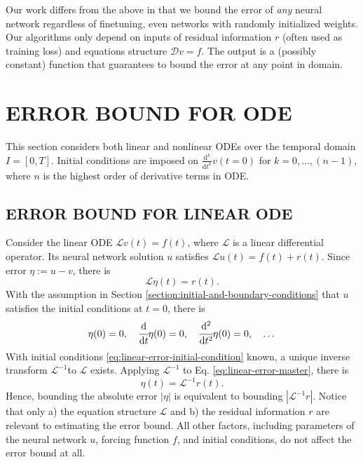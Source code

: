 \documentclass{uai2023}
\newcommand{\dt}[1]{\cfrac{\mathrm{d} #1}{\mathrm{d} t}}
\newcommand{\dnt}[2]{\cfrac{\mathrm{d}^{#1} #2}{\mathrm{d} t^{#1}}}
\newcommand{\Err}{\eta}
\renewcommand{\L}{\mathcal{L}}
\begin{document}
    Our work differs from the above in that we bound the error of \textit{any} neural network regardless of finetuning, even networks with randomly initialized weights.
    Our algorithms only depend on inputs of residual information $r$ (often used as training loss) and equations structure $\mathcal{D} v = f$.
    The output is a (possibly constant) function that guarantees to bound the error at any point in domain.

\section{ERROR BOUND FOR ODE}  \label{section:error-bound-for-ode}
    This section considers both linear and nonlinear ODEs over the temporal domain $I=[0, T]$. 
    Initial conditions are imposed on $\frac{\mathrm{d}^k}{\mathrm{d}t^k}v(t=0)$ for $k = 0, \dots, (n - 1)$, where $n$ is the highest order of derivative terms in ODE.

\subsection{ERROR BOUND FOR LINEAR ODE}\label{section:error-bound-for-linear-odes}
    Consider the linear ODE $\L v(t) = f(t)$, where $\L$ is a linear differential operator. 
    Its neural network solution $u$ satisfies $\L u(t) = f(t) + r(t)$. 
    Since error $\Err := u - v$, there is
    {   
        \small
        \begin{equation} \label{eq:linear-error-master}
            \L \Err(t) = r(t).
        \end{equation}
    }
    With the assumption in Section \ref{section:initial-and-boundary-conditions} that $u$ satisfies the initial conditions at $t=0$, there is
    {
        \small
        \begin{equation} \label{eq:linear-error-initial-condition}
            \Err(0) = 0, \quad \dt{}{}\Err(0) = 0, \quad \dnt{2}{}\Err(0) = 0, \quad \dots 
        \end{equation}
    }
    With initial conditions \ref{eq:linear-error-initial-condition} known, a unique inverse transform $\L^{-1}$to $\L$ exists. 
    Applying $\L^{-1}$ to Eq. \ref{eq:linear-error-master}, there is 
    {
        \small
        \begin{equation}\label{eq:linear-error-inverse-master}
            \Err(t) = \L^{-1} r(t).
        \end{equation}
    }
    Hence, bounding the absolute error $\left|\Err\right|$ is equivalent to bounding $\left|\L^{-1} r\right|$. 
    Notice that only a) the equation structure $\L$ and b) the residual information $r$ are relevant to estimating the error bound. 
    All other factors, including parameters of the neural network $u$, forcing function $f$, and initial conditions, do not affect the error bound at all.
\end{document}
